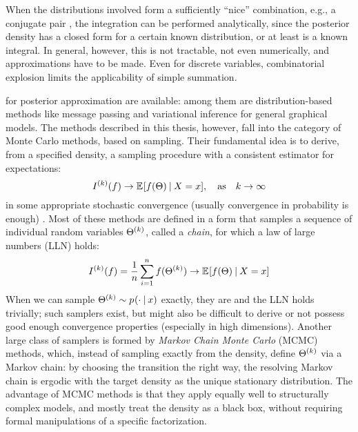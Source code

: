When the distributions involved form a sufficiently \enquote{nice} combination, e.g., a conjugate
pair , the integration can be performed analytically, since the posterior density has a
closed form for a certain known distribution, or at least is a known integral.  In general, however,
this is not tractable, not even numerically, and approximations have to be made.  Even for discrete
variables, combinatorial explosion limits the applicability of simple summation.

 for posterior approximation are available: among them are
distribution-based methods like message passing and variational inference for general graphical
models.  The methods described in this thesis, however, fall into the category of Monte
Carlo methods, based on sampling. Their fundamental idea is to derive, from a specified density, a
sampling procedure with a consistent estimator for expectations:
\begin{equation}
  \label{eq:mc-methods}
  \kth{I}(f) \to \Exp{f(\Theta) \given X = x}, \quad \text{as} \quad k
  \to \infty
\end{equation}
in some appropriate stochastic convergence (usually convergence in probability is enough)
\parencite[chapter 1]{vihola2020lectures}.  Most of these methods are defined in a form that samples
a sequence of individual random variables \(\Theta^{(k)}\), called a \emph{chain}, for which a law
of large numbers (LLN) holds:
\begin{equation}
  \label{eq:mc-lln}
  \kth{I}(f) = \frac{1}{n} \sum_{i=1}^{n} f(\kth{\Theta}) \to \Exp{f(\Theta) \given X = x}
\end{equation}
When we can sample \(\kth{\Theta} \from \prob{\cdot \given x}\) exactly, they are \iid{} and the LLN
holds trivially; such samplers exist, but might also be difficult to derive or not possess good
enough convergence properties (especially in high dimensions).  Another large class of samplers is
formed by \emph{Markov Chain Monte Carlo} (MCMC) methods, which, instead of sampling exactly from
the density, define \(\Theta^{(k)}\) via a Markov chain: by choosing the transition the right way,
the resolving Markov chain is ergodic with the target density as the unique stationary distribution.
The advantage of MCMC methods is that they apply equally well to structurally complex models, and
mostly treat the density as a black box, without requiring formal manipulations of a specific
factorization.

